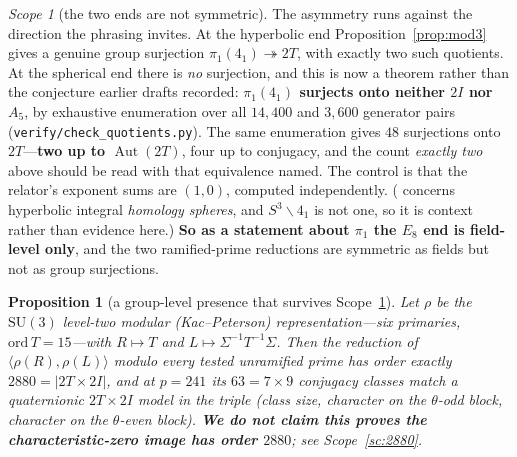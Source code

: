 \documentclass[11pt,reqno]{amsart}
\theoremstyle{plain}
\newtheorem{proposition}[theorem]{Proposition}
\theoremstyle{definition}
\theoremstyle{remark}
\newtheorem{scope}[theorem]{Scope}
\newcommand{\fn}[1]{\texttt{\small #1}}
\begin{document}
\begin{scope}[the two ends are not symmetric]\label{sc:asym}
The asymmetry runs against the direction the phrasing invites. At the hyperbolic end
Proposition~\ref{prop:mod3} gives a genuine group surjection
$\pi_1(4_1)\twoheadrightarrow 2T$, with exactly two such quotients. At the spherical end there is
\emph{no} surjection, and this is now a theorem rather than the conjecture earlier drafts
recorded: \textbf{$\pi_1(4_1)$ surjects onto neither $2I$ nor $A_5$}, by exhaustive
enumeration over all $14{,}400$ and $3{,}600$ generator pairs
(\fn{verify/check\_\allowbreak quotients.py}). The same enumeration gives $48$ surjections
onto $2T$---\textbf{two up to $\operatorname{Aut}(2T)$}, four up to conjugacy, and the
count \emph{exactly two} above should be read with that equivalence named. The control is
that the relator's exponent sums are $(1,0)$, computed independently. (\cite{Stuebner}
concerns hyperbolic integral \emph{homology spheres}, and $S^3\smallsetminus4_1$ is not
one, so it is context rather than evidence here.) \textbf{So as a
statement about $\pi_1$ the $E_8$ end is field-level only}, and the two ramified-prime
reductions are symmetric as fields but not as group surjections.
\end{scope}

\begin{proposition}[a group-level presence that survives Scope~\ref{sc:asym}]\label{prop:2880}
Let $\rho$ be the $\mathrm{SU}(3)$ level-two modular (Kac--Peterson) representation---six
primaries, $\mathrm{ord}\,T=15$---with $R\mapsto T$ and $L\mapsto \Sigma^{-1}T^{-1}\Sigma$.
Then the reduction of $\langle\rho(R),\rho(L)\rangle$ modulo every tested unramified
prime has order exactly $2880=|2T\times2I|$, and at $p=241$ its $63=7\times9$ conjugacy
classes match a quaternionic $2T\times2I$ model in the triple (class size, character on the
$\theta$-odd block, character on the $\theta$-even block).
\textbf{We do not claim this proves the characteristic-zero image has order $2880$}; see
Scope~\ref{sc:2880}.
\end{proposition}
\end{document}
